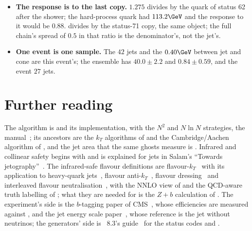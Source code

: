 \begin{itemize}
    definitions are run with the last $b$ and $c$ hadrons put back in
    place of their descendants, as the papers' hadron-level tests do;
    the neutrinos of their decays are then inside the hadron, and the
    jets of that run differ from \akfour at the border by a few hundred
    MeV.
  \item \textbf{The response is to the last copy.} $1.275$ divides by
    the quark of status 62 after the shower; the hard-process quark had
    $113.2\GeV$ and the response to it would be $0.88$. \CMSSW divides by
    the status-71 copy, the same object; the full chain's spread of $0.5$
    in that ratio is the denominator's, not the jet's.
  \item \textbf{One event is one sample.} The $42$ jets and the
    $0.40\GeV$ between jet and cone are this event's; the ensemble has
    $40.0\pm2.2$ and $0.84\pm0.59$, and the \CMSSW event $27$ jets.
\end{itemize}

\section{Further reading}
\label{sec:family_photograph:further_reading}
The \antikt algorithm is \cite{Cacciari:2008gp} and its implementation,
with the $N^2$ and $N\ln N$ strategies, the \FASTJET
manual~\cite{Cacciari:2011ma}; its ancestors are the $k_T$ algorithms of
\cite{Catani:1993hr,Ellis:1993tq} and the Cambridge/Aachen algorithm of
\cite{Dokshitzer:1997in,Wobisch:1998wt}, and the jet area that the same
ghosts measure is \cite{Cacciari:2008gn}. Infrared and collinear safety
begins with \cite{Sterman:1977wj} and is explained for jets in Salam's
``Towards jetography''~\cite{Salam:2009jx}. The infrared-safe flavour
definitions are flavour-$k_T$~\cite{Banfi:2006hf} with its application to
heavy-quark jets~\cite{Banfi:2007gu}, flavour anti-$k_T$~\cite{Czakon:2022khx},
flavour dressing~\cite{Gauld:2022lem} and interleaved flavour
neutralisation~\cite{Caletti:2022glq}, with the NNLO view of
\cite{Caletti:2022hnc} and the QCD-aware truth labelling of
\cite{Buckley:2015gua}; what they are needed for is the $Z+b$
calculation of \cite{Gauld:2020deh}. The experiment's side is the
$b$-tagging paper of CMS~\cite{CMS:2017wtu}, whose efficiencies are
measured against \hadflav, and the jet energy scale
paper~\cite{CMS:2016lmd}, whose reference is the jet without neutrinos;
the generators' side is \PYTHIA~8.3's guide~\cite{Bierlich:2022pfr} for
the status codes and .

